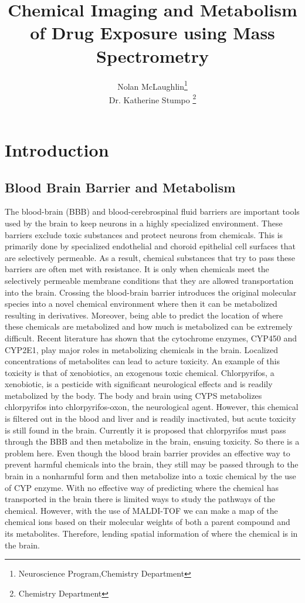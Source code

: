 \documentclass{article}\usepackage[]{graphicx}\usepackage[]{color}
\begin{document}
\title {Chemical Imaging and Metabolism of Drug Exposure using Mass Spectrometry}
\author {Nolan McLaughlin\thanks{Neuroscience Program,Chemistry Department} \\ Dr. Katherine Stumpo \thanks{Chemistry Department}}
\maketitle

\date{}

\section{Introduction}
\subsection{Blood Brain Barrier and Metabolism}
	The blood-brain (BBB) and blood-cerebrospinal fluid barriers are important tools used by the brain to keep neurons in a highly specialized environment. These barriers exclude toxic substances and protect neurons from chemicals. This is primarily done by specialized endothelial and choroid epithelial cell surfaces that are selectively permeable. As a result, chemical substances that try to pass these barriers are often met with resistance. It is only when chemicals meet the selectively permeable membrane conditions that they are allowed transportation into the brain. 
Crossing the blood-brain barrier introduces the original molecular species into a novel chemical environment where then it can be metabolized resulting in derivatives. Moreover, being able to predict the location of where these chemicals are metabolized and how much is metabolized can be extremely difficult.  Recent literature has shown that the cytochrome enzymes, CYP450 and CYP2E1, play major roles in metabolizing chemicals in the brain\cite{garcia2017role}. Localized concentrations of metabolites can lead to acture toxicity. An example of this toxicity is that of xenobiotics, an exogenous toxic chemical. Chlorpyrifos, a xenobiotic, is a pesticide with significant neurological effects and is readily metabolized by the body. The body and brain using CYPS metabolizes chlorpyrifos into chlorpyrifos-oxon, the neurological agent. However, this chemical is filtered out in the blood and liver and is readily inactivated, but acute toxicity is   still found in the brain. Currently it is proposed that chlorpyrifos must pass through the BBB and then metabolize in the brain, ensuing toxicity\cite{khokhar2012rat}.
	So there is a problem here. Even though the blood brain barrier provides an effective way to prevent harmful chemicals into the brain, they still may be passed through to the brain in a nonharmful form and then metabolize into a toxic chemical by the use of CYP enzyme. With no effective way of predicting where the chemical has transported in the brain there is limited ways to study the pathways of the chemical. However, with the use of MALDI-TOF we can make a map of the chemical ions based on their molecular weights of both a parent compound and its metabolites. Therefore, lending spatial information of where the chemical is in the brain.
\end{document}
